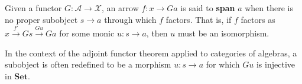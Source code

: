 Given a functor $G : \mathcal{A} \to \mathcal{X}$, an arrow $f : x \to G a$ is said to \textbf{span} $a$ when there is no proper subobject $s \to a$ through which $f$ factors. That is, if $f$ factors as $x \xrightarrow{f'} G s \xrightarrow{G u} G a$ for some monic $u : s \to a$, then $u$ must be an isomorphism.

In the context of the adjoint functor theorem applied to categories of algebras, a subobject is often redefined to be a morphism $u : s \to a$ for which $G u$ is injective in $\mathbf{Set}$.
